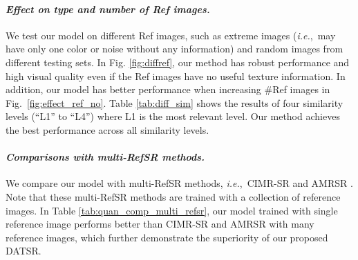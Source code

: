 \documentclass[runningheads]{llncs}
\def\ie{\mbox{\textit{i.e.}, }}
\begin{document}
\paragraph{\textbf{\emph{Effect on type and number of Ref images.}}}
We test our model on different Ref images, such as extreme images (\ie may have only one color or noise without any information) and random images from different testing sets.
In Fig. \ref{fig:diffref}, our method has robust performance and high visual quality even if the Ref images have no useful texture information.
In addition, our model has better performance when increasing \#Ref images in Fig.~\ref{fig:effect_ref_no}. Table \ref{tab:diff_sim} shows the results of four similarity levels (``L1'' to ``L4'') where L1 is the most relevant level.
Our method achieves the best performance across all similarity levels. 


\paragraph{\textbf{\emph{Comparisons with multi-RefSR methods.}}}
We compare our model with multi-RefSR methods, \ie CIMR-SR \cite{yantowards} and AMRSR \cite{pesavento2021attention}.
Note that these multi-RefSR methods are trained with a collection of reference images.
In Table \ref{tab:quan_comp_multi_refsr}, our model trained with single reference image performs better than CIMR-SR and AMRSR with many reference images, which further demonstrate the superiority of our proposed DATSR.
\end{document}
